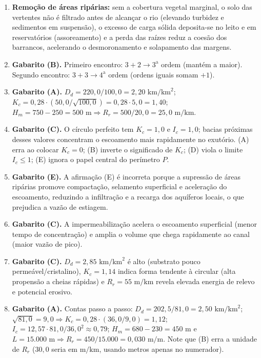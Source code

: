 \begin{boxGabarito}
\begin{enumerate}[leftmargin=1.8em, itemsep=3.5pt]
  \item \textbf{Remoção de áreas ripárias:} sem a cobertura vegetal marginal, o solo das vertentes não é filtrado antes de alcançar o rio (elevando turbidez e sedimentos em suspensão), o excesso de carga sólida deposita-se no leito e em reservatórios (assoreamento) e a perda das raízes reduz a coesão dos barrancos, acelerando o desmoronamento e solapamento das margens.

  \item \textbf{Gabarito (B).} Primeiro encontro: $3 + 2 \to 3^{\text{a}}$ ordem (mantém a maior). Segundo encontro: $3 + 3 \to 4^{\text{a}}$ ordem (ordens iguais somam $+1$).

  \item \textbf{Gabarito (A).} $D_d = 220{,}0 / 100{,}0 = 2{,}20\text{ km}/\text{km}^2$; $K_c = 0{,}28 \cdot (50{,}0 / \sqrt{100{,}0}) = 0{,}28 \cdot 5{,}0 = 1{,}40$; $H_m = 750 - 250 = 500\text{ m} \Rightarrow R_r = 500 / 20{,}0 = 25{,}0\text{ m}/\text{km}$.

  \item \textbf{Gabarito (C).} O círculo perfeito tem $K_c = 1{,}0$ e $I_c = 1{,}0$; bacias próximas desses valores concentram o escoamento mais rapidamente no exutório. (A) erra ao colocar $K_c = 0$; (B) inverte o significado de $K_c$; (D) viola o limite $I_c \le 1$; (E) ignora o papel central do perímetro $P$.

  \item \textbf{Gabarito (E).} A afirmação (E) é incorreta porque a supressão de áreas ripárias promove compactação, selamento superficial e aceleração do escoamento, reduzindo a infiltração e a recarga dos aquíferos locais, o que prejudica a vazão de estiagem.

  \item \textbf{Gabarito (C).} A impermeabilização acelera o escoamento superficial (menor tempo de concentração) e amplia o volume que chega rapidamente ao canal (maior vazão de pico).

  \item \textbf{Gabarito (C).} $D_d = 2{,}85\text{ km}/\text{km}^2$ é alto (substrato pouco permeável/cristalino), $K_c = 1{,}14$ indica forma tendente à circular (alta propensão a cheias rápidas) e $R_r = 55\text{ m}/\text{km}$ revela elevada energia de relevo e potencial erosivo.

  \item \textbf{Gabarito (A).} Contas passo a passo: $D_d = 202{,}5 / 81{,}0 = 2{,}50\text{ km}/\text{km}^2$; $\sqrt{81{,}0} = 9{,}0 \Rightarrow K_c = 0{,}28 \cdot (36{,}0 / 9{,}0) = 1{,}12$; $I_c = 12{,}57 \cdot 81{,}0 / 36{,}0^2 \approx 0{,}79$; $H_m = 680 - 230 = 450\text{ m}$ e $L = 15.000\text{ m} \Rightarrow R_r = 450 / 15.000 = 0{,}030\text{ m}/\text{m}$. Note que (B) erra a unidade de $R_r$ ($30{,}0$ seria em $\text{m}/\text{km}$, usando metros apenas no numerador).


\end{enumerate}
\end{boxGabarito}

